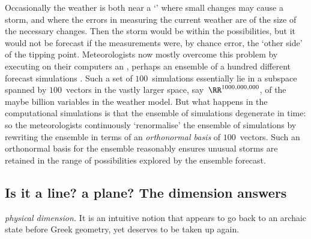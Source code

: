 Occasionally the weather is both near a `' where small changes may cause a storm, and where the errors in measuring the current weather are of the size of the necessary changes.
Then the storm would be within the possibilities, but it would not be forecast if the measurements were, by chance error, the `other side' of the tipping point.
Meteorologists now mostly overcome this problem by executing on their computers an , perhaps an ensemble of a hundred different forecast simulations \cite[pp.274--80, e.g.]{Roulstone2013}.
Such a set of \(100\)~simulations essentially lie in a subspace spanned by \(100\)~vectors in the vastly larger space, say~\(\RR^{1000,000,000}\), of the maybe billion variables in the weather model.
But what happens in the computational simulations is that the ensemble of simulations degenerate in time: so the meteorologists continuously `renormalise' the ensemble of simulations by rewriting the ensemble in terms of an \emph{orthonormal basis} of \(100\)~vectors.
Such an orthonormal basis for the ensemble reasonably ensures unusual storms are retained in the range of possibilities explored by the ensemble forecast.





\subsection{Is it a line? a plane? The dimension answers}


\begin{quoted}{\cite{Mandelbrot1982}}
\emph{physical dimension.} It is an intuitive notion that appears to go back to an archaic state before Greek geometry, yet deserves to be taken up again.
\end{quoted}

